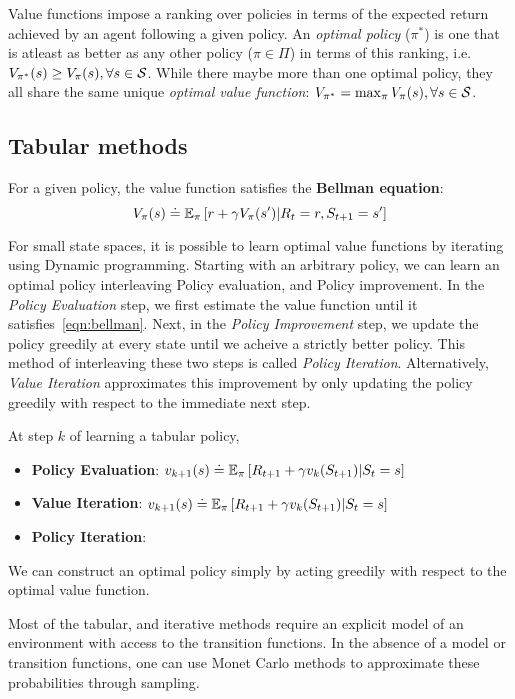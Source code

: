 Value functions impose a ranking over policies in terms of the expected return achieved by an agent
following a given policy.
An \textit{optimal policy} ($\pi^\ast$) is one that is atleast as better as any other policy ($\pi
	\in \Pi$) in terms of this ranking, i.e. $V_{\pi^\ast}(s) \geq V_\pi(s), \forall s \in \mathcal{S}$.
While there maybe more than one optimal policy, they all share the same unique \textit{optimal
	value function}: $V_{\pi^{\ast}} = \max_{\pi} V_\pi(s), \forall s \in \mathcal{S}$.

\subsection{Tabular methods}
For a given policy, the value function satisfies the \textbf{Bellman equation}:
\begin{equation}
	\label{eqn:bellman} V_\pi(s) \doteq \mathbb{E}_\pi \left[r + \gamma V_\pi(s') | R_t = r, S_{t+1} = s'
		\right]
\end{equation}

For small state spaces, it is possible to learn optimal
value functions by iterating using Dynamic programming.
Starting with an arbitrary policy, we can learn an optimal policy interleaving Policy evaluation,
and Policy improvement.
In the \textit{Policy Evaluation} step, we first estimate the value function until it
satisfies~\ref{eqn:bellman}.
Next, in the \textit{Policy Improvement} step, we update the policy greedily at every state until
we acheive a strictly better policy.
This method of interleaving these two steps is called \textit{Policy Iteration}.
Alternatively, \textit{Value Iteration} approximates this improvement by only updating the policy
greedily with respect to the immediate next step.

At step $k$ of learning a tabular policy,
\begin{itemize}
	\item \textbf{Policy Evaluation}:
	      $v_{k+1}(s) \doteq \mathbb{E}_\pi \left[R_{t+1} + \gamma v_k(S_{t+1}) |S_t =s\right]$
	\item \textbf{Value
		      Iteration}: $v_{k+1}(s) \doteq \mathbb{E}_\pi \left[R_{t+1} + \gamma v_k(S_{t+1}) |S_t =s\right]$
	\item
	      \textbf{Policy Iteration}:
\end{itemize}

We can construct an optimal policy
simply by acting greedily with respect to the optimal value function.

Most of the tabular, and iterative methods require an explicit model of an environment with access
to the transition functions.
In the absence of a model or transition functions, one can use Monet Carlo methods to approximate
these probabilities through sampling.

